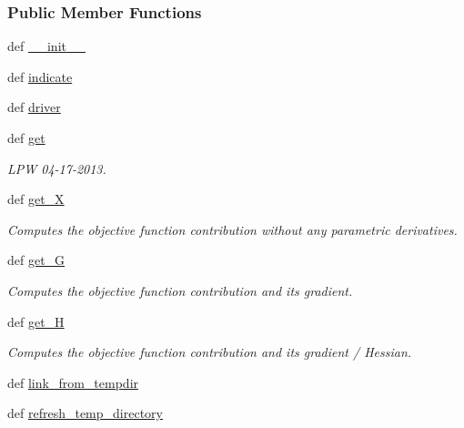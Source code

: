 \subsubsection*{Public Member Functions}
\begin{DoxyCompactItemize}
\item 
def \hyperlink{classforcebalance_1_1psi4io_1_1RDVR3__Psi4_afa204152dedeaf62137dd3f30e5f86ae}{\-\_\-\-\_\-init\-\_\-\-\_\-}
\item 
def \hyperlink{classforcebalance_1_1psi4io_1_1RDVR3__Psi4_a27735c91ca9ae70cb32552396a8485ac}{indicate}
\item 
def \hyperlink{classforcebalance_1_1psi4io_1_1RDVR3__Psi4_a8c4cf7a59ef8714519631145669a5df9}{driver}
\item 
def \hyperlink{classforcebalance_1_1psi4io_1_1RDVR3__Psi4_a70936cb704ab5df307013cc6aa5b85c8}{get}
\begin{DoxyCompactList}\small\item\em L\-P\-W 04-\/17-\/2013. \end{DoxyCompactList}\item 
def \hyperlink{classforcebalance_1_1target_1_1Target_a606dd136f195c267c05a2455405e5949}{get\-\_\-\-X}
\begin{DoxyCompactList}\small\item\em Computes the objective function contribution without any parametric derivatives. \end{DoxyCompactList}\item 
def \hyperlink{classforcebalance_1_1target_1_1Target_afa8cc38c8bba8861c072e789717aa049}{get\-\_\-\-G}
\begin{DoxyCompactList}\small\item\em Computes the objective function contribution and its gradient. \end{DoxyCompactList}\item 
def \hyperlink{classforcebalance_1_1target_1_1Target_a1d2ee27fe86a09769c1816af23b09adb}{get\-\_\-\-H}
\begin{DoxyCompactList}\small\item\em Computes the objective function contribution and its gradient / Hessian. \end{DoxyCompactList}\item 
def \hyperlink{classforcebalance_1_1target_1_1Target_a5aa4958cea0a48138511567a076c5a82}{link\-\_\-from\-\_\-tempdir}
\item 
def \hyperlink{classforcebalance_1_1target_1_1Target_afe815eafab06ac92f10bbf4b88ad95c8}{refresh\-\_\-temp\-\_\-directory}

\end{DoxyCompactItemize}

